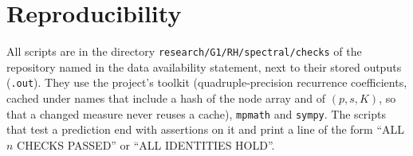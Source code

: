 \section{Reproducibility}\label{app:repro}

All scripts are in the directory \texttt{research/G1/RH/spectral/checks} of the repository named in the data
availability statement, next to their stored outputs (\texttt{.out}). They use the project's toolkit (quadruple-precision
recurrence coefficients, cached under names that include a hash of the node array and of $(p,s,K)$, so that a changed
measure never reuses a cache), \texttt{mpmath} and \texttt{sympy}. The scripts that test a prediction end with assertions
on it and print a line of the form ``ALL $n$ CHECKS PASSED'' or ``ALL IDENTITIES HOLD''.

